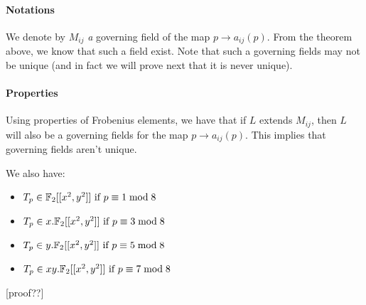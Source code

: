 \paragraph{Notations}
We denote by $M_{ij}$ \textit{a} governing field of the map $p \to a_{ij}(p)$.
From the theorem above, we know that such a field exist.
Note that such a governing fields may not be unique (and in fact we will prove next that it is never unique).

\paragraph{Properties}
Using properties of Frobenius elements, we have that if $L$ extends $M_{ij}$, then $L$ will also be a governing fields for the map $p \to a_{ij}(p)$.
This implies that governing fields aren't unique.

We also have:
\begin{itemize}
	\item $T_p \in \mathbb{F}_2[[x^2, y^2]] \text{ if } p \equiv 1 \bmod 8$
	\item $T_p \in x.\mathbb{F}_2[[x^2, y^2]] \text{ if } p \equiv 3 \bmod 8$
	\item $T_p \in y.\mathbb{F}_2[[x^2, y^2]] \text{ if } p \equiv 5 \bmod 8$
	\item $T_p \in xy.\mathbb{F}_2[[x^2, y^2]] \text{ if } p \equiv 7 \bmod 8$
\end{itemize}
\cite[§7]{StructureAlgebreHecke}
[proof??]

